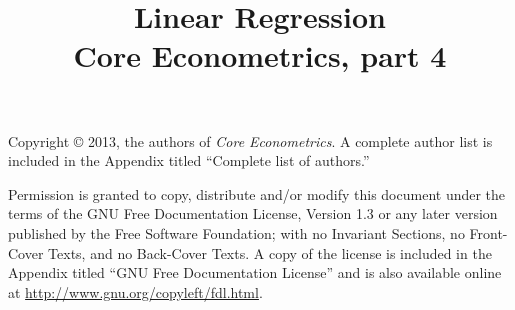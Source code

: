\documentclass[nohyper]{tufte-handout}
\title[Linear regression]%
{Linear Regression \\
  Core Econometrics, part 4}
\begin{document}
\maketitle

\bigskip\noindent%
Copyright © 2013, the authors of \textit{Core Econometrics}.  A
complete author list is included in the Appendix titled ``Complete
list of authors.''

Permission is granted to copy, distribute and/or modify this document
under the terms of the GNU Free Documentation License, Version 1.3 or
any later version published by the Free Software Foundation; with no
Invariant Sections, no Front-Cover Texts, and no Back-Cover Texts.  A
copy of the license is included in the Appendix titled ``GNU Free
Documentation License'' and is also available online at
\url{http://www.gnu.org/copyleft/fdl.html}.

\tableofcontents








\end{document}
